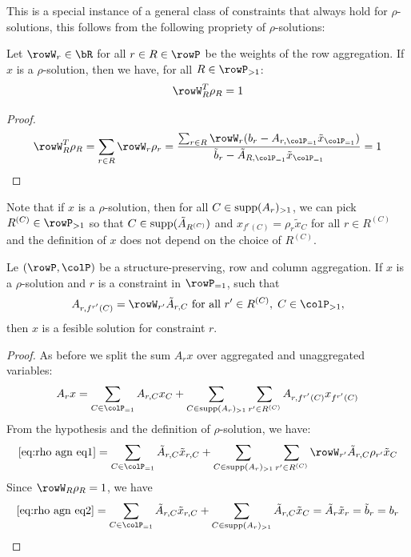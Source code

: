 This is a special instance of a general class of constraints that always hold for \(\rho\)-solutions, this follows from the following propriety of \(\rho\)-solutions:

\begin{observation}
  \label{ob:rhoconvex}
  Let \(\rowW_r \in \bR\) for all \(r \in R \in \rowP\) be the weights of the row aggregation.
  If \(x\) is a \(\rho\)-solution, then we have, for all \(R \in \rowP_{>1}\):
  \begin{equation}
    \rowW_R^T \rho_R = 1
  \end{equation}
\end{observation}
\begin{proof}
  \[
  \rowW_R^T \rho_R = \sum_{r \in R} \rowW_r \rho_r =  \frac{\sum_{r \in R}\rowW_r(b_r - A_{r, \colP_{=1}} \tilde{x}_{\colP_{=1}})}{\tilde{b}_r
  - \tilde{A}_{R, \colP_{=1}} \tilde{x}_{\colP_{=1}}} = 1
  \] 
\end{proof}
Note that if \(x\) is a \(\rho\)-solution, then for all \(C \in \operatorname{supp}(A_{r})_{>1}\), we can pick \(R^{(C)} \in \rowP_{>1}\) so that \(C \in \operatorname{supp}(\tilde{A}_{R^{(C)}})\) and \(x_{f^r(C)} = \rho_r \tilde{x}_C\) for all \(r \in R^{(C)}\) and the definition of \(x\) does not depend on the choice of \(R^{(C)}\).
\begin{observation}
  Le \((\rowP,\colP)\) be a structure-preserving, row and column aggregation. If \(x\) is a \(\rho\)-solution and \(r\) is a constraint in \(\rowP_{=1}\), such that 
  \[A_{r,f^{r'}(C)} = \rowW_{r'}\tilde{A}_{r,C} \text{ for all } r' \in R^{(C)},\; C \in \colP_{>1}, \]
  then \(x\) is a fesible solution for constraint \(r\).
\end{observation}

\begin{proof}
As before we split the sum \(A_rx\) over aggregated and unaggregated variables:
\begin{equation}
  \label{eq:rho agn eq1}
  A_rx = \sum_{C \in \colP_{=1}}A_{r,C}x_{C} +  \sum_{C \in \supp(A_{r})_{>1}} \sum_{r' \in R^{(C)}} A_{r,f^{r'}(C)}x_{f^{r'}(C)}
\end{equation}
From the hypothesis and the definition of \(\rho\)-solution, we have:
\begin{equation}
  \label{eq:rho agn eq2}
    \eqref{eq:rho agn eq1} =  \sum_{C \in \colP_{=1}}\tilde{A}_{r,C}\tilde{x}_{r,C} +  \sum_{C \in \supp(A_{r})_{>1}} \sum_{r' \in R^{(C)}}\rowW_{r'} \tilde{A}_{r,C}\rho_{r'}\tilde{x}_{C} 
\end{equation}
Since \(\rowW_R \rho_R = 1\), we have
\begin{equation}
  \label{eq:rho agn eq3}
    \eqref{eq:rho agn eq2} =   \sum_{C \in \colP_{=1}}\tilde{A}_{r,C}\tilde{x}_{r,C} +  \sum_{C \in \supp(A_{r})_{>1}}\tilde{A}_{r,C}\tilde{x}_{C} = \tilde{A}_r\tilde{x}_r = \tilde{b}_r = b_r
\end{equation}
\end{proof}

